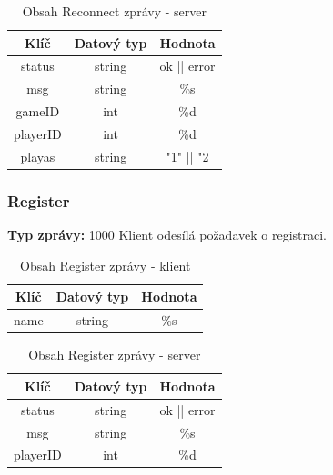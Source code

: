 \documentclass[12pt, a4paper]{article}
\begin{document}
    \begin{table}[H]
        \centering
        \begin{tabular}{|c|c|c|}
            \hline
            Klíč & Datový typ & Hodnota \\
            \hline
            \hline
            status & string & ok || error \\
            \hline
            msg & string & \%s \\
            \hline
            gameID & int & \%d \\
            \hline
            playerID & int & \%d \\
            \hline
            playas & string & "1" || "2 \\
            \hline
        \end{tabular}
        \caption{Obsah Reconnect zprávy - server}
    \end{table}

\subsubsection{Register}
\textbf{Typ zprávy: } 1000 \newline
Klient odesílá požadavek o registraci. \newline

    \begin{table}[H]
        \centering
        \begin{tabular}{|c|c|c|}
            \hline
            Klíč & Datový typ & Hodnota \\
            \hline
            \hline
            name & string & \%s \\
            \hline
        \end{tabular}
        \caption{Obsah Register zprávy - klient}
    \end{table}

    \begin{table}[H]
        \centering
        \begin{tabular}{|c|c|c|}
            \hline
            Klíč & Datový typ & Hodnota \\
            \hline
            \hline
            status & string & ok || error \\
            \hline
            msg & string & \%s \\
            \hline
            playerID & int & \%d \\
            \hline
        \end{tabular}
        \caption{Obsah Register zprávy - server}
    \end{table}
\end{document}
